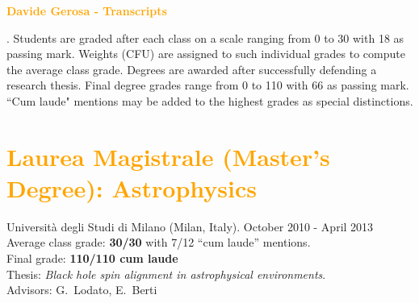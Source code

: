 \documentclass[a4paper,10pt,notitlepage]{paper}
\newcommand{\col}[1]{{\textcolor{Orange}{#1}}}
\begin{document}
\begin{center}
\begin{huge}
\textbf{\col{Davide Gerosa - Transcripts}} 
\end{huge}
\end{center}
\vspace{0.3cm}


{ \small {}. Students are graded after each class  on a scale ranging from 0 to 30 with 18 as passing mark. Weights (CFU) are assigned to such individual grades to compute the average class grade. Degrees are awarded after successfully defending a research thesis. Final degree grades range from 0 to 110 with 66 as passing mark. {``Cum laude"} mentions may be added to the highest grades as special distinctions.

}

\section*{\col{Laurea Magistrale (Master's Degree): Astrophysics}}
Università degli Studi di Milano (Milan, Italy). October 2010 - April 2013\\
Average class grade: \textbf{30/30} with 7/12 ``cum laude'' mentions. \\
Final grade: \textbf{110/110 cum laude} \\
Thesis: {\it Black hole spin alignment in astrophysical environments}. \\
Advisors: G.~Lodato, E.~Berti\\
\end{document}
